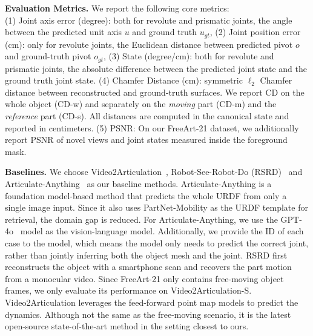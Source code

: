 \noindent\textbf{Evaluation Metrics.}
We report the following core metrics:\\
(1) Joint axis error (degree): both for revolute and prismatic joints, 
the angle between the predicted unit axis ${u}$ and ground truth ${u}_{gt}$,
(2) Joint position error (cm): only for revolute joints, the Euclidean distance between predicted pivot ${o}$ and ground-truth pivot ${o}_{gt}$,
(3) State (degree/cm): both for revolute and prismatic joints, the absolute difference between the predicted joint state and the ground truth joint state.
(4) Chamfer Distance (cm): symmetric $\ell_2$ Chamfer distance between reconstructed and ground-truth surfaces. 
We report CD on the whole object (CD-w) 
and separately on the \emph{moving} part (CD-m) and the \emph{reference} part (CD-s). 
All distances are computed in the canonical state and reported in centimeters.
(5) PSNR: On our FreeArt-21 dataset, 
we additionally report PSNR of novel views and joint states measured inside the foreground mask. 

\noindent\textbf{Baselines.} We choose Video2Articulation~\cite{video2articulation}, Robot-See-Robot-Do (RSRD)~\cite{kerrrobot} and Articulate-Anything~\cite{articulateanything} as our baseline methods. Articulate-Anything is a foundation model-based method that predicts the whole URDF from only a single image input. Since it also uses PartNet-Mobility as the URDF template for retrieval, the domain gap is reduced. For Articulate-Anything, we use the GPT-4o~\cite{hurst2024gpt} model as the vision-language model. Additionally, we provide the ID of each case to the model, which means the model only needs to predict the correct joint, rather than jointly inferring both the object mesh and the joint.
RSRD first reconstructs the object with a smartphone scan and recovers the part motion from a monocular video. Since FreeArt-21 only contains free-moving object frames, we only evaluate its performance on Video2Articulation-S. Video2Articulation leverages the feed-forward point map models to predict the dynamics. Although not the same as the free-moving scenario, it is the latest open-source state-of-the-art method in the setting closest to ours. 

